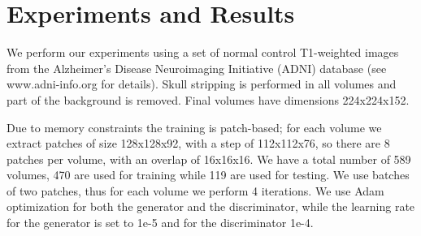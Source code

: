 \documentclass{article}
\begin{document}



\section{Experiments and Results}
\label{sec:expresults}

We perform our experiments using a set of normal control T1-weighted images from the Alzheimer’s Disease Neuroimaging Initiative (ADNI) database (see www.adni-info.org for details). Skull stripping is performed in all volumes and part of the background is removed. Final volumes have dimensions 224x224x152.

Due to memory constraints the training is patch-based; for each volume we extract patches of size 128x128x92, with a step of 112x112x76, so there are 8 patches per volume, with an overlap of 16x16x16. We have a total number of 589 volumes, 470 are used for training while 119 are used for testing. We use batches of two patches, thus for each volume we perform 4 iterations. We use Adam optimization for both the generator and the discriminator, while the learning rate for the generator is set to 1e-5 and for the discriminator 1e-4.
\end{document}
